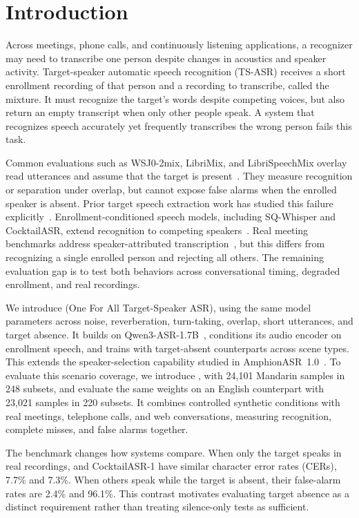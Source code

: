 \section{Introduction}
\label{sec:introduction}
Across meetings, phone calls, and continuously listening applications, a recognizer may need to transcribe one person despite changes in acoustics and speaker activity.
Target-speaker automatic speech recognition (TS-ASR) receives a short enrollment recording of that person and a recording to transcribe, called the mixture.
It must recognize the target's words despite competing voices, but also return an empty transcript when only other people speak.
A system that recognizes speech accurately yet frequently transcribes the wrong person fails this task.

Common evaluations such as WSJ0-2mix, LibriMix, and LibriSpeechMix overlay read utterances and assume that the target is present~\cite{hershey2016deep,cosentino2020librimix,kanda2020serialized}.
They measure recognition or separation under overlap, but cannot expose false alarms when the enrolled speaker is absent.
Prior target speech extraction work has studied this failure explicitly~\cite{delcroix2022listen,borsdorf2021universal,zhang2023speaker}.
Enrollment-conditioned speech models, including SQ-Whisper and CocktailASR, extend recognition to competing speakers~\cite{guo2024sqwhisper,zhang2025thinking,zhang2026xiaomi}.
Real meeting benchmarks address speaker-attributed transcription~\cite{liang2023second,vinnikov2024notsofar}, but this differs from recognizing a single enrolled person and rejecting all others.
The remaining evaluation gap is to test both behaviors across conversational timing, degraded enrollment, and real recordings.

We introduce \model (One For All Target-Speaker ASR), using the same model parameters across noise, reverberation, turn-taking, overlap, short utterances, and target absence.
It builds on Qwen3-ASR-1.7B~\cite{shi2026qwen3asr}, conditions its audio encoder on enrollment speech, and trains with target-absent counterparts across scene types.
This extends the speaker-selection capability studied in AmphionASR~1.0~\cite{amphion2026amphionasr}.
To evaluate this scenario coverage, we introduce \bench, with 24{,}101 Mandarin samples in 248 subsets, and evaluate the same weights on an English counterpart with 23{,}021 samples in 220 subsets.
It combines controlled synthetic conditions with real meetings, telephone calls, and web conversations, measuring recognition, complete misses, and false alarms together.

The benchmark changes how systems compare.
When only the target speaks in real recordings, \model and CocktailASR-1 have similar character error rates (CERs), 7.7\% and 7.3\%.
When others speak while the target is absent, their false-alarm rates are 2.4\% and 96.1\%.
This contrast motivates evaluating target absence as a distinct requirement rather than treating silence-only tests as sufficient.
